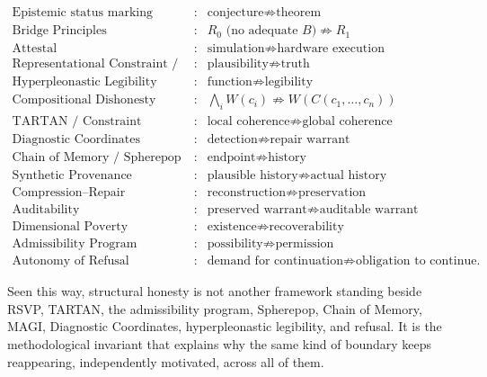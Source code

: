 \documentclass[11pt]{article}
\begin{document}
\[
\begin{array}{lll}
\text{Epistemic status marking} & : & \text{conjecture} \not\Rightarrow \text{theorem} \\
\text{Bridge Principles} & : & R_0 \text{ (no adequate } B\text{)} \not\Rightarrow R_1 \\
\text{Attestal} & : & \text{simulation} \not\Rightarrow \text{hardware execution} \\
\text{Representational Constraint / MAGI} & : & \text{plausibility} \not\Rightarrow \text{truth} \\
\text{Hyperpleonastic Legibility} & : & \text{function} \not\Rightarrow \text{legibility} \\
\text{Compositional Dishonesty} & : & \textstyle\bigwedge_i W(c_i) \not\Rightarrow W(C(c_1,\ldots,c_n)) \\
\text{TARTAN / Constraint Closure} & : & \text{local coherence} \not\Rightarrow \text{global coherence} \\
\text{Diagnostic Coordinates} & : & \text{detection} \not\Rightarrow \text{repair warrant} \\
\text{Chain of Memory / Spherepop} & : & \text{endpoint} \not\Rightarrow \text{history} \\
\text{Synthetic Provenance} & : & \text{plausible history} \not\Rightarrow \text{actual history} \\
\text{Compression--Repair} & : & \text{reconstruction} \not\Rightarrow \text{preservation} \\
\text{Auditability} & : & \text{preserved warrant} \not\Rightarrow \text{auditable warrant} \\
\text{Dimensional Poverty} & : & \text{existence} \not\Rightarrow \text{recoverability} \\
\text{Admissibility Program} & : & \text{possibility} \not\Rightarrow \text{permission} \\
\text{Autonomy of Refusal} & : & \text{demand for continuation} \not\Rightarrow \text{obligation to continue.}
\end{array}
\]

Seen this way, structural honesty is not another framework standing beside RSVP, TARTAN, the admissibility program, Spherepop, Chain of Memory, MAGI, Diagnostic Coordinates, hyperpleonastic legibility, and refusal. It is the methodological invariant that explains why the same kind of boundary keeps reappearing, independently motivated, across all of them.
\end{document}
